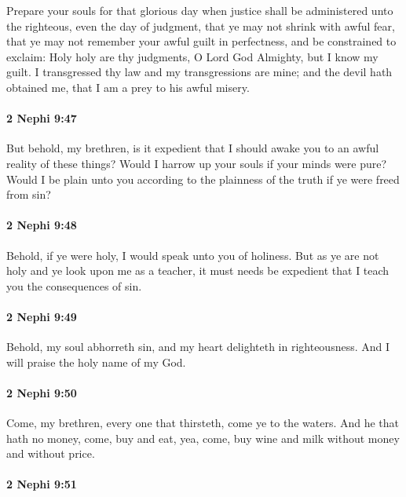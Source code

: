 			Prepare your souls for that glorious day
			when justice shall be administered unto the righteous,
			even the day of judgment,
			that ye may not shrink with awful fear,
			that ye may not remember your awful guilt in perfectness,
			and be constrained to exclaim:
			Holy holy are thy judgments, O Lord God Almighty,
			but I know my guilt.
			I transgressed thy law and my transgressions are mine;
			and the devil hath obtained me,
			that I am a prey to his awful misery.

		\paragraph{2 Nephi 9:47} %
			\label{2NEPHI-9-47}

			But behold, my brethren,
			is it expedient that I should awake you to an awful reality of these things?
			Would I harrow up your souls if your minds were pure?
			Would I be plain unto you according to the plainness of the truth
			if ye were freed from sin?

		\paragraph{2 Nephi 9:48} %
			\label{2NEPHI-9-48}

			Behold, if ye were holy, I would speak unto you of holiness.
			But as ye are not holy and ye look upon me as a teacher,
			it must needs be expedient that I teach you the consequences of sin.

		\paragraph{2 Nephi 9:49} %
			\label{2NEPHI-9-49}

			Behold, my soul abhorreth sin,
			and my heart delighteth in righteousness.
			And I will praise the holy name of my God.

		\paragraph{2 Nephi 9:50} %
			\label{2NEPHI-9-50}

			Come, my brethren, every one that thirsteth, come ye to the waters.
			And he that hath no money, come, buy and eat,
			yea, come, buy wine and milk without money and without price.

		\paragraph{2 Nephi 9:51} %
			\label{2NEPHI-9-51}

